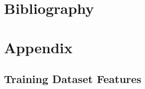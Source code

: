 \documentclass[11pt,a4paper]{article}
\begin{document}
    \newpage
    \section{Bibliography}
    \nocite{simple_xgb, detailed_eda}

    

    \newpage
    \section{Appendix}
    \subsection{Training Dataset Features}
    \label{appendix:training}
\end{document}
